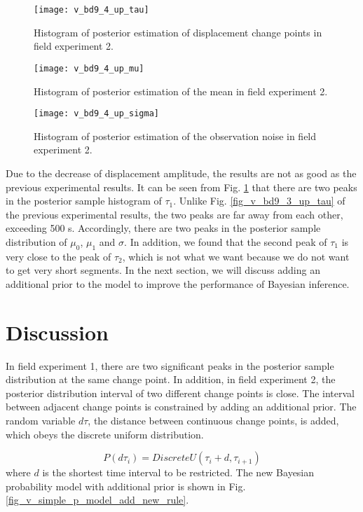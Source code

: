 \documentclass{svjour3}                     %
\begin{document}
\begin{figure}[htbp]
	\centering
	\texttt{[image: v\_bd9\_4\_up\_tau]}
	\caption{Histogram of posterior estimation of displacement change points in field experiment 2.}
	\label{fig_v_bd9_4_up_tau}
\end{figure} 
\begin{figure}[htbp]
	\centering
	\texttt{[image: v\_bd9\_4\_up\_mu]}
	\caption{Histogram of posterior estimation of the mean in field experiment 2.}
	\label{fig_v_bd9_4_up_mu}
\end{figure} 
\begin{figure}[htbp]
	\centering
	\texttt{[image: v\_bd9\_4\_up\_sigma]}
	\caption{Histogram of posterior estimation of the observation noise in field experiment 2.}
	\label{fig_v_bd9_4_up_sigma}
\end{figure}
Due to the decrease of displacement amplitude, the results are not as good as the previous experimental results. 
It can be seen from Fig. \ref{fig_v_bd9_4_up_tau} that there are two peaks in the posterior sample histogram of $\tau_1$. Unlike Fig. \ref{fig_v_bd9_3_up_tau} of the previous experimental results, the two peaks are far away from each other, exceeding 500 s. Accordingly, there are two peaks in the posterior sample distribution of $\mu_0$, $\mu_1$ and $\sigma$. In addition, we found that the second peak of $\tau_1$ is very close to the peak of $\tau_2$, which is not what we want because we do not want to get very short segments. In the next section, we will discuss adding an additional prior to the model to improve the performance of Bayesian inference.
\section{Discussion}
\label{disc}
In field experiment 1, there are two significant peaks in the posterior sample distribution at the same change point. In addition, in field experiment 2, the posterior distribution interval of two different change points is close.
The interval between adjacent change points is constrained by adding an additional prior. 
The random variable $d\tau$, the distance between continuous change points, is added, which obeys the  discrete uniform distribution.

\begin{equation}\label{eq_bayesian_prior_d_tau}
P(d\tau_{i})=DiscreteU(\tau_{i} + d,\tau_{i+1})
\end{equation}
where $d$ is the shortest time interval to be restricted. The new Bayesian probability model with additional prior is shown in Fig. \ref{fig_v_simple_p_model_add_new_rule}.
\end{document}
